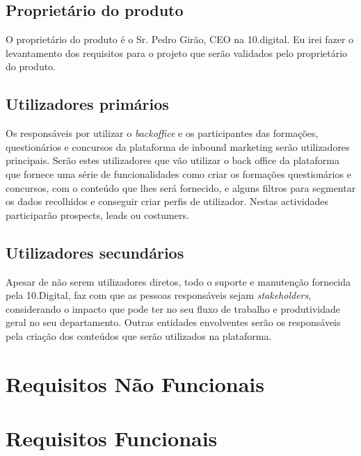 \subsection{Proprietário do produto}

O proprietário do produto é o Sr. Pedro Girão, CEO na 10.digital. Eu irei fazer o levantamento dos requisitos para o projeto que serão validados pelo proprietário do produto.

\subsection{Utilizadores primários}

Os responsáveis por utilizar o \textit{backoffice} e os participantes das formações, questionários e concursos da plataforma de inbound marketing serão utilizadores principais. Serão estes utilizadores que vão utilizar o back office da plataforma que fornece uma série de funcionalidades como criar os formações questionários e concursos, com o conteúdo que lhes será fornecido, e alguns filtros para segmentar os dados recolhidos e conseguir criar perfis de utilizador. Nestas actividades participarão prospects, leads ou costumers.


\subsection{Utilizadores secundários}

Apesar de não serem utilizadores diretos, todo o suporte e manutenção fornecida pela 10.Digital, faz com que as pessoas responsáveis sejam \textit{stakeholders}, considerando o impacto que pode ter no seu fluxo de trabalho e produtividade geral no seu departamento. 
Outras entidades envolventes serão os responsáveis pela criação dos conteúdos que serão utilizados na plataforma.


\section{Requisitos Não Funcionais}
\label{rnf}


\section{Requisitos Funcionais}
\label{rf}




